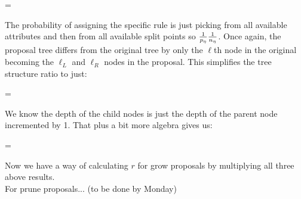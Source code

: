 \beqn
{} = 
\eeqn

The probability of assigning the specific rule is just picking from all available attributes and then from all available split points so $\frac{1}{p_\eta}\frac{1}{n_\eta}$. Once again, the proposal tree differs from the original tree by only the $\ell$th node in the original becoming the $\ell_L$ and $\ell_R$ nodes in the proposal. This simplifies the tree structure ratio to just:

\beqn
{} =  
\eeqn

We know the depth of the child nodes is just the depth of the parent node incremented by 1. That plus a bit more algebra gives us:

\beqn
{} = \alpha {} 
\eeqn

Now we have a way of calculating $r$ for grow proposals by multiplying all three above results.\\

For prune proposals... (to be done by Monday)


